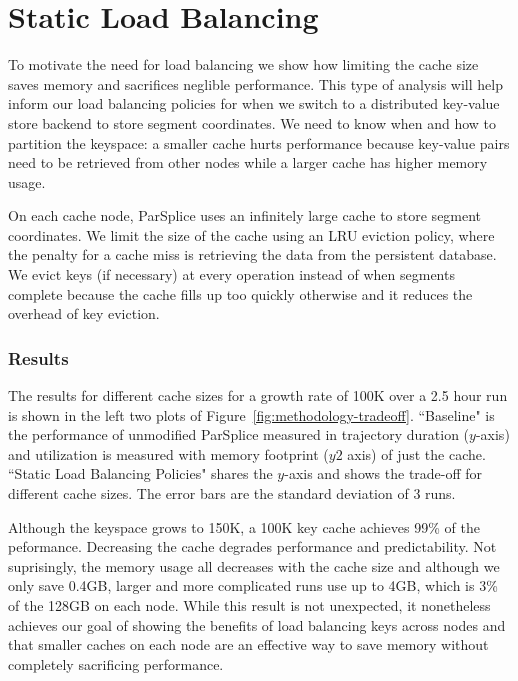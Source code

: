 \section{Static Load Balancing}
\label{sec:static-load-balancing}

To motivate the need for load balancing we show how limiting the cache size
saves memory and sacrifices neglible performance. This type of analysis will
help inform our load balancing policies for when we switch to a distributed
key-value store backend to store segment coordinates.  We need to know when and
how to partition the keyspace: a smaller cache hurts performance because
key-value pairs need to be retrieved from other nodes while a larger cache has
higher memory usage. 

On each cache node, ParSplice uses an infinitely large cache to store segment
coordinates. We limit the size of the cache using an LRU eviction policy, where
the penalty for a cache miss is retrieving the data from the persistent
database.  We evict keys (if necessary) at every operation instead of when
segments complete because the cache fills up too quickly otherwise and it
reduces the overhead of key eviction.

\subsubsection*{Results}
The results for different cache sizes for a growth rate of 100K over a 2.5 hour
run is shown in the left two plots of Figure~\ref{fig:methodology-tradeoff}.
``Baseline" is the performance of unmodified ParSplice  measured in trajectory
duration (\(y\)-axis) and utilization is measured with memory footprint (\(y2\)
axis) of just the cache.  ``Static Load Balancing Policies" shares the
\(y\)-axis and shows the trade-off for different cache sizes. The error bars
are the standard deviation of 3 runs. 

Although the keyspace grows to 150K, a 100K key cache achieves 99\% of the
peformance. Decreasing the cache degrades performance and predictability.  Not
suprisingly, the memory usage all decreases with the cache size and although we
only save 0.4GB, larger and more complicated runs use up to 4GB, which is 3\%
of the 128GB on each node.  While this result is not unexpected, it nonetheless
achieves our goal of showing the benefits of load balancing keys across nodes
and that smaller caches on each node are an effective way to save memory
without completely sacrificing performance.

